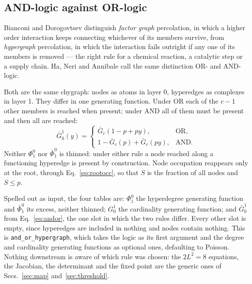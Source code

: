 \documentclass[aps,pre,twocolumn,superscriptaddress,floatfix,longbibliography]{revtex4-2}
\newcommand{\code}[1]{\texttt{#1}}
\begin{document}
\subsection{AND-logic against OR-logic}

Bianconi and Dorogovtsev \cite{bianconi2024} distinguish \emph{factor graph}
percolation, in which a higher order interaction keeps connecting whichever of
its members survive, from \emph{hypergraph} percolation, in which the
interaction fails outright if any one of its members is removed --- the right
rule for a chemical reaction, a catalytic step or a supply chain. Ha, Neri and
Annibale \cite{ha2025} call the same distinction OR- and AND-logic.

Both are the same chygraph: nodes as atoms in layer 0, hyperedges as complexes
in layer 1. They differ in one generating function. Under OR each of the
$c-1$ other members is reached when present; under AND all of them must be
present and then all are reached:
\begin{equation}
  \bar G^1_0(y)=
  \begin{cases}
    \bar G_c(1-p+py), & \text{OR},\\[2pt]
    1-\bar G_c(p)+\bar G_c(py), & \text{AND}.
  \end{cases}
  \label{eq:andor}
\end{equation}
Neither $\Phi^0_1$ nor $\bar\Phi^0_1$ is thinned: under either rule a node
reached along a functioning hyperedge is present by construction. Node
occupation reappears only at the root, through Eq.~\eqref{eq:rootocc}, so that
$S$ is the fraction of all nodes and $S\le p$.

Spelled out as input, the four tables are: $\Phi^0_1$ the hyperdegree generating
function and $\bar\Phi^0_1$ its excess, neither thinned; $G^1_0$ the cardinality
generating function; and $\bar G^1_0$ from Eq.~\eqref{eq:andor}, the one slot in
which the two rules differ. Every other slot is empty, since hyperedges are
included in nothing and nodes contain nothing. This is
\code{and\_or\_hypergraph}, which takes the logic as its first argument and the
degree and cardinality generating functions as optional ones, defaulting to
Poisson. Nothing downstream is aware of which rule was chosen: the $2L^2=8$
equations, the Jacobian, the determinant and the fixed point are the generic
ones of Secs.~\ref{sec:map} and~\ref{sec:threshold}.
\end{document}
